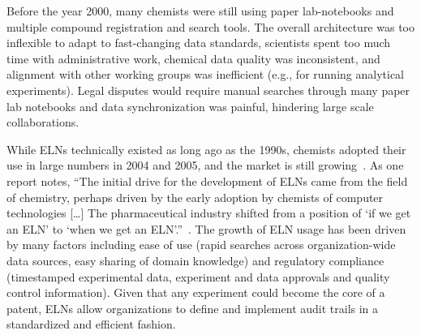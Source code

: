 \documentclass{sig-alternate}
\begin{document}
Before the year 2000, many chemists were still using paper
lab-notebooks and multiple compound registration and search
tools. The overall architecture was too inflexible to
adapt to fast-changing data standards, scientists spent too much time
with administrative work, chemical data quality was inconsistent, and
alignment with other working groups was inefficient (e.g., for
running analytical experiments). Legal disputes would require manual
searches through many paper lab notebooks and data synchronization was
painful, hindering large scale collaborations.


While ELNs technically existed as long ago as the 1990s, chemists
adopted their use in large numbers in 2004 and 2005, and the market is
still growing~\cite{ELNstatus}. As one report notes, ``The initial
drive for the development of ELNs came from the field of chemistry,
perhaps driven by the early adoption by chemists of computer
technologies [\ldots] The pharmaceutical industry shifted from a
position of `if we get an ELN' to `when we get an
ELN'.''~\cite{ELNstatus}. The growth of ELN usage has been
driven by many factors including ease of use (rapid searches across
organization-wide data sources, easy sharing of domain knowledge) and
regulatory compliance (timestamped experimental data, experiment and
data approvals and quality control information). Given that any experiment could
become the core of a patent, ELNs allow organizations to define
and implement audit trails in a standardized and efficient fashion.
\end{document}
